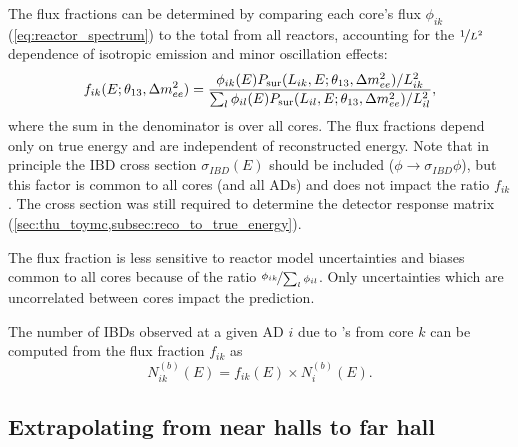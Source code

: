 The flux fractions can be determined
by comparing each core's \nuebar{} flux $\phi_{ik}$ (\cref{eq:reactor_spectrum})
to the total from all reactors,
accounting for the $\nicefrac{1}{L^2}$ dependence of isotropic \nuebar{} emission
and minor oscillation effects:
\begin{equation}\label{eq:flux_fraction}
    f_{ik}(E;\theta_{13},\Delta m^2_{ee}) = \frac{
        \phi_{ik}(E) P_\text{sur} (L_{ik}, E;\theta_{13},\Delta m^2_{ee})/L_{ik}^2
    }{
        \sum_l \phi_{il}(E)P_\text{sur}(L_{il}, E;\theta_{13},\Delta m^2_{ee})/L_{il}^2
    },
\end{equation}
where the sum in the denominator is over all cores.
The flux fractions depend only on true \nuebar{} energy
and are independent of reconstructed energy.
Note that in principle the IBD cross section $\sigma_{IBD}(E)$
should be included ($\phi \to \sigma_{IBD}\phi$),
but this factor is common to all cores (and all ADs)
and does not impact the ratio $f_{ik}$.
The cross section was still required to determine the detector response matrix
(\cref{sec:thu_toymc,subsec:reco_to_true_energy}).

The flux fraction is less sensitive to reactor \nuebar{} model uncertainties and biases
common to all cores
because of the ratio $\nicefrac{\phi_{ik}}{\sum_l\phi_{il}}$.
Only uncertainties which are uncorrelated between cores
impact the prediction.

The number of IBDs observed at a given AD $i$ due to \nuebar{}'s from core $k$
can be computed from the flux fraction $f_{ik}$ as
\begin{equation}\label{eq:num_ibds_from_core_ij}
    N_{ik}^{(b)}(E) = f_{ik}(E) \times N_i^{(b)}(E).
\end{equation}

\subsection{Extrapolating from near halls to far hall}
\label{subsec:extrapolation}

